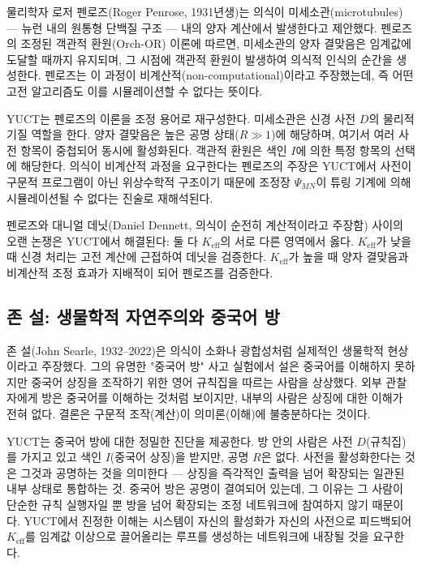 \documentclass[12pt,a4paper]{article}
\begin{document}
	물리학자 로저 펜로즈(Roger Penrose, 1931년생)는 의식이 미세소관(microtubules) — 뉴런 내의 원통형 단백질 구조 — 내의 양자 계산에서 발생한다고 제안했다. 펜로즈의 조정된 객관적 환원(Orch-OR) 이론에 따르면, 미세소관의 양자 결맞음은 임계값에 도달할 때까지 유지되며, 그 시점에 객관적 환원이 발생하여 의식적 인식의 순간을 생성한다. 펜로즈는 이 과정이 비계산적(non-computational)이라고 주장했는데, 즉 어떤 고전 알고리즘도 이를 시뮬레이션할 수 없다는 뜻이다.
	
	YUCT는 펜로즈의 이론을 조정 용어로 재구성한다. 미세소관은 신경 사전 \(D\)의 물리적 기질 역할을 한다. 양자 결맞음은 높은 공명 상태(\(R \gg 1\))에 해당하며, 여기서 여러 사전 항목이 중첩되어 동시에 활성화된다. 객관적 환원은 색인 \(I\)에 의한 특정 항목의 선택에 해당한다. 의식이 비계산적 과정을 요구한다는 펜로즈의 주장은 YUCT에서 사전이 구문적 프로그램이 아닌 위상수학적 구조이기 때문에 조정장 \(\Psi_{MN}\)이 튜링 기계에 의해 시뮬레이션될 수 없다는 진술로 재해석된다.
	
	펜로즈와 대니얼 데닛(Daniel Dennett, 의식이 순전히 계산적이라고 주장함) 사이의 오랜 논쟁은 YUCT에서 해결된다: 둘 다 \(K_{\mathrm{eff}}\)의 서로 다른 영역에서 옳다. \(K_{\mathrm{eff}}\)가 낮을 때 신경 처리는 고전 계산에 근접하여 데닛을 검증한다. \(K_{\mathrm{eff}}\)가 높을 때 양자 결맞음과 비계산적 조정 효과가 지배적이 되어 펜로즈를 검증한다.
	
	\subsection{존 설: 생물학적 자연주의와 중국어 방}
	
	존 설(John Searle, 1932–2022)은 의식이 소화나 광합성처럼 실제적인 생물학적 현상이라고 주장했다. 그의 유명한 "중국어 방" 사고 실험에서 설은 중국어를 이해하지 못하지만 중국어 상징을 조작하기 위한 영어 규칙집을 따르는 사람을 상상했다. 외부 관찰자에게 방은 중국어를 이해하는 것처럼 보이지만, 내부의 사람은 상징에 대한 이해가 전혀 없다. 결론은 구문적 조작(계산)이 의미론(이해)에 불충분하다는 것이다.
	
	YUCT는 중국어 방에 대한 정밀한 진단을 제공한다. 방 안의 사람은 사전 \(D\)(규칙집)를 가지고 있고 색인 \(I\)(중국어 상징)을 받지만, 공명 \(R\)은 없다. 사전을 활성화한다는 것은 그것과 공명하는 것을 의미한다 — 상징을 즉각적인 출력을 넘어 확장되는 일관된 내부 상태로 통합하는 것. 중국어 방은 공명이 결여되어 있는데, 그 이유는 그 사람이 단순한 규칙 실행자일 뿐 방을 넘어 확장되는 조정 네트워크에 참여하지 않기 때문이다. YUCT에서 진정한 이해는 시스템이 자신의 활성화가 자신의 사전으로 피드백되어 \(K_{\mathrm{eff}}\)를 임계값 이상으로 끌어올리는 루프를 생성하는 네트워크에 내장될 것을 요구한다.
	
\end{document}
